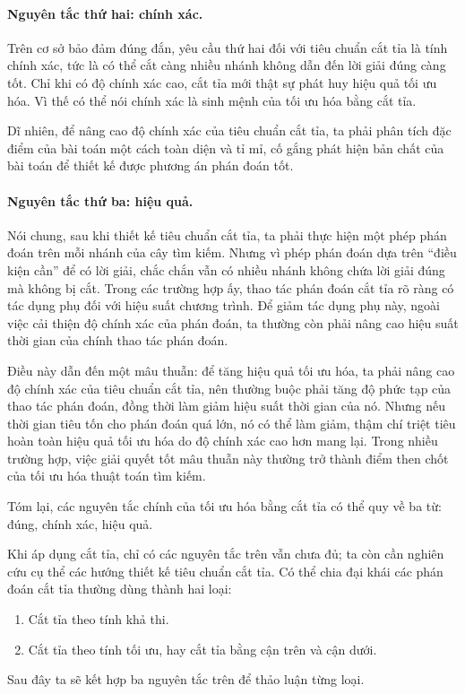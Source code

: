 \documentclass[11pt]{article}
\begin{document}
\paragraph{Nguyên tắc thứ hai: chính xác.}
Trên cơ sở bảo đảm đúng đắn, yêu cầu thứ hai đối với tiêu chuẩn cắt tỉa là
tính chính xác, tức là có thể cắt càng nhiều nhánh không dẫn đến lời giải
đúng càng tốt. Chỉ khi có độ chính xác cao, cắt tỉa mới thật sự phát huy hiệu
quả tối ưu hóa. Vì thế có thể nói chính xác là sinh mệnh của tối ưu hóa bằng
cắt tỉa.

Dĩ nhiên, để nâng cao độ chính xác của tiêu chuẩn cắt tỉa, ta phải phân tích
đặc điểm của bài toán một cách toàn diện và tỉ mỉ, cố gắng phát hiện bản chất
của bài toán để thiết kế được phương án phán đoán tốt.

\paragraph{Nguyên tắc thứ ba: hiệu quả.}
Nói chung, sau khi thiết kế tiêu chuẩn cắt tỉa, ta phải thực hiện một phép
phán đoán trên mỗi nhánh của cây tìm kiếm. Nhưng vì phép phán đoán dựa trên
``điều kiện cần'' để có lời giải, chắc chắn vẫn có nhiều nhánh không chứa lời
giải đúng mà không bị cắt. Trong các trường hợp ấy, thao tác phán đoán cắt
tỉa rõ ràng có tác dụng phụ đối với hiệu suất chương trình. Để giảm tác dụng
phụ này, ngoài việc cải thiện độ chính xác của phán đoán, ta thường còn phải
nâng cao hiệu suất thời gian của chính thao tác phán đoán.

Điều này dẫn đến một mâu thuẫn: để tăng hiệu quả tối ưu hóa, ta phải nâng cao
độ chính xác của tiêu chuẩn cắt tỉa, nên thường buộc phải tăng độ phức tạp
của thao tác phán đoán, đồng thời làm giảm hiệu suất thời gian của nó. Nhưng
nếu thời gian tiêu tốn cho phán đoán quá lớn, nó có thể làm giảm, thậm chí
triệt tiêu hoàn toàn hiệu quả tối ưu hóa do độ chính xác cao hơn mang lại.
Trong nhiều trường hợp, việc giải quyết tốt mâu thuẫn này thường trở thành
điểm then chốt của tối ưu hóa thuật toán tìm kiếm.

Tóm lại, các nguyên tắc chính của tối ưu hóa bằng cắt tỉa có thể quy về ba
từ: đúng, chính xác, hiệu quả.

Khi áp dụng cắt tỉa, chỉ có các nguyên tắc trên vẫn chưa đủ; ta còn cần
nghiên cứu cụ thể các hướng thiết kế tiêu chuẩn cắt tỉa. Có thể chia đại khái
các phán đoán cắt tỉa thường dùng thành hai loại:
\begin{enumerate}
  \item Cắt tỉa theo tính khả thi.
  \item Cắt tỉa theo tính tối ưu, hay cắt tỉa bằng cận trên và cận dưới.
\end{enumerate}
Sau đây ta sẽ kết hợp ba nguyên tắc trên để thảo luận từng loại.
\end{document}
